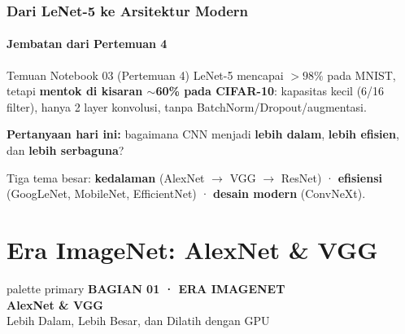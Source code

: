 \documentclass[t,aspectratio=169,xcolor=dvipsnames]{beamer}
\newcommand{\bagian}[3]{%
\begin{frame}[plain]
  \begin{beamercolorbox}[wd=\paperwidth,ht=\paperheight,sep=1.5cm]{palette primary}
    \vspace{1.5cm}
    {\scriptsize\bfseries\color{dlMute}#1}\\[0.4cm]
    {\Huge\bfseries #2}\\[0.4cm]
    {\small\color{dlHairline}#3}
    \vfill
  \end{beamercolorbox}
\end{frame}}
\begin{document}
\begin{frame}
    \frametitle{Dari LeNet-5 ke Arsitektur Modern}
    \framesubtitle{Jembatan dari Pertemuan 4}
    \footnotesize

    \begin{alertblock}{Temuan Notebook 03 (Pertemuan 4)}
        LeNet-5 mencapai $>98\%$ pada MNIST, tetapi \textbf{mentok di kisaran $\sim$60\% pada CIFAR-10}: kapasitas kecil (6/16 filter), hanya 2 layer konvolusi, tanpa BatchNorm/Dropout/augmentasi.
    \end{alertblock}

    \textbf{Pertanyaan hari ini:} bagaimana CNN menjadi \textbf{lebih dalam}, \textbf{lebih efisien}, dan \textbf{lebih serbaguna}?

    \vspace{0.3cm}
    \begin{center}
    \end{center}

    \vspace{0.1cm}
    {\scriptsize\color{dlMute} Tiga tema besar: \textbf{kedalaman} (AlexNet $\to$ VGG $\to$ ResNet) · \textbf{efisiensi} (GoogLeNet, MobileNet, EfficientNet) · \textbf{desain modern} (ConvNeXt).}
\end{frame}

\section{Era ImageNet: AlexNet \& VGG}
\bagian{BAGIAN 01 · ERA IMAGENET}{AlexNet \& VGG}{Lebih Dalam, Lebih Besar, dan Dilatih dengan GPU}
\end{document}
